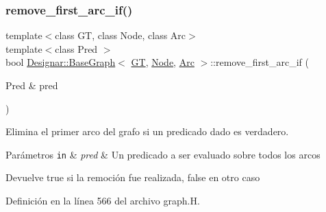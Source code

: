 \subsubsection{\texorpdfstring{remove\+\_\+first\+\_\+arc\+\_\+if()}{remove\_first\_arc\_if()}\hspace{0.1cm}{\footnotesize\ttfamily [1/2]}}
{\footnotesize\ttfamily template$<$class GT, class Node, class Arc$>$ \\
template$<$class Pred $>$ \\
bool \hyperlink{class_designar_1_1_base_graph}{Designar\+::\+Base\+Graph}$<$ \hyperlink{demo-buildgraph_8_c_a3001c40d2c31ca87ed96cd7d1334a55e}{GT}, \hyperlink{namespace_designar_a5af326c65aa2bd26b26c410f2030d09e}{Node}, \hyperlink{namespace_designar_a3f55fb5513d62ff47cbc8f72b8e95d6f}{Arc} $>$\+::remove\+\_\+first\+\_\+arc\+\_\+if (\begin{DoxyParamCaption}\item[{Pred \&}]{pred }\end{DoxyParamCaption})\hspace{0.3cm}{\ttfamily [inline]}}



Elimina el primer arco del grafo si un predicado dado es verdadero. 


\begin{DoxyParams}[1]{Parámetros}
\mbox{\tt in}  & {\em pred} & Un predicado a ser evaluado sobre todos los arcos \\
\hline
\end{DoxyParams}
\begin{DoxyReturn}{Devuelve}
{\ttfamily true} si la remoción fue realizada, {\ttfamily false} en otro caso 
\end{DoxyReturn}


Definición en la línea 566 del archivo graph.\+H.

\mbox{\label{class_designar_1_1_base_graph_a990426c9e87f922bbbd0c9bc4d2cedd8}} 
